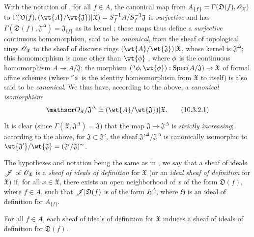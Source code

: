 \begin{env}[10.3.2]
\label{1.10.3.2}
With the notation of , for all $f\in A$, the canonical map from $A_{\{f\}}=\Gamma(\mathfrak{D}(f),\mathscr{O}_\mathfrak{X})$ to $\Gamma(\mathfrak{D}(f),(\wt{A}/\wt{\mathfrak{J}})|\mathfrak{X})=S_f^{-1}A/S_f^{-1}\mathfrak{J}$ is \emph{surjective} and has $\Gamma(\mathfrak{D}(f),\mathfrak{J}^\Delta)=\mathfrak{J}_{\{f\}}$ as its kernel ; these maps thus define a \emph{surjective} continuous homomorphism, said to be \emph{canonical}, from the sheaf of topological rings $\mathscr{O}_\mathfrak{X}$ to the sheaf of discrete rings $(\wt{A}/\wt{\mathfrak{J}})|\mathfrak{X}$, whose kernel is $\mathfrak{J}^\Delta$; this homomorphism is none other than $\wt{\vphi}$ , where $\phi$ is the continuous homomorphism $A\to A/\mathfrak{J}$; the morphism $({}^a\vphi,\wt{\vphi}):\Spec(A/\mathfrak{J})\to\mathfrak{X}$ of formal affine schemes (where ${}^a\phi$ is the identity homeomorphism from $\mathfrak{X}$ to itself) is also said to be \emph{canonical}.
We thus have, according to the above, a \emph{canonical isomorphism}
\begin{equation*}
\label{1.10.3.2.1}
  \sh{O}_\mathfrak{X}/\mathfrak{J}^\Delta\isoto(\wt{A}/\wt{\mathfrak{J}})|\mathfrak{X}.
  \tag{10.3.2.1}
\end{equation*}

It is clear (since $\Gamma(\mathfrak{X},\mathfrak{J}^\Delta)=\mathfrak{J}$) that the map $\mathfrak{J}\to\mathfrak{J}^\Delta$ is \emph{strictly increasing}; according to the above, for $\mathfrak{J}\subset\mathfrak{J}'$, the sheaf ${\mathfrak{J}'}^\Delta/\mathfrak{J}^\Delta$ is canonically isomorphic to $\wt{\mathfrak{J}'}/\wt{\mathfrak{J}}=(\mathfrak{J}'/\mathfrak{J})^\sim$.
\end{env}

\begin{env}[10.3.3]
\label{1.10.3.3}
The hypotheses and notation being the same as in , we say that a sheaf of ideals $\mathscr{J}$ of $\mathscr{O}_\mathfrak{X}$ is a \emph{sheaf of ideals of definition} for $\mathfrak{X}$ (or an \emph{ideal sheaf of definition} for $\mathfrak{X}$) if, for all $x\in\mathfrak{X}$, there exists an open neighborhood of $x$ of the form $\mathfrak{D}(f)$, where $f\in A$, such that $\mathscr{J}|\mathfrak{D}(f)$ is of the form $\mathfrak{H}^\Delta$, where $\mathfrak{H}$ is an ideal of definition for $A_{\{f\}}$.
\end{env}

\begin{proposition}[10.3.4]
\label{1.10.3.4}
For all $f\in A$, each sheaf of ideals of definition for $\mathfrak{X}$ induces a sheaf of ideals of definition for $\mathfrak{D}(f)$.
\end{proposition}


